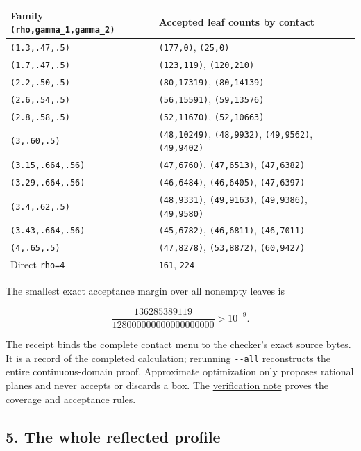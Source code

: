 \begin{longtable}[]{@{}ll@{}}
\toprule\noalign{}
Family \texttt{(rho,gamma\_1,gamma\_2)} & Accepted leaf counts by contact \\
\midrule\noalign{}
\endhead
\bottomrule\noalign{}
\endlastfoot
\texttt{(1.3,.47,.5)} & \texttt{(177,0)}, \texttt{(25,0)} \\
\texttt{(1.7,.47,.5)} & \texttt{(123,119)}, \texttt{(120,210)} \\
\texttt{(2.2,.50,.5)} & \texttt{(80,17319)}, \texttt{(80,14139)} \\
\texttt{(2.6,.54,.5)} & \texttt{(56,15591)}, \texttt{(59,13576)} \\
\texttt{(2.8,.58,.5)} & \texttt{(52,11670)}, \texttt{(52,10663)} \\
\texttt{(3,.60,.5)} & \texttt{(48,10249)}, \texttt{(48,9932)}, \texttt{(49,9562)}, \texttt{(49,9402)} \\
\texttt{(3.15,.664,.56)} & \texttt{(47,6760)}, \texttt{(47,6513)}, \texttt{(47,6382)} \\
\texttt{(3.29,.664,.56)} & \texttt{(46,6484)}, \texttt{(46,6405)}, \texttt{(47,6397)} \\
\texttt{(3.4,.62,.5)} & \texttt{(48,9331)}, \texttt{(49,9163)}, \texttt{(49,9386)}, \texttt{(49,9580)} \\
\texttt{(3.43,.664,.56)} & \texttt{(45,6782)}, \texttt{(46,6811)}, \texttt{(46,7011)} \\
\texttt{(4,.65,.5)} & \texttt{(47,8278)}, \texttt{(53,8872)}, \texttt{(60,9427)} \\
Direct \texttt{rho=4} & \texttt{161}, \texttt{224} \\
\end{longtable}

The smallest exact acceptance margin over all nonempty leaves is

\[
\frac{136285389119}{128000000000000000000}>10^{-9}.
\]

The receipt binds the complete contact menu to the checker's exact source bytes. It is a record of the completed calculation; rerunning \texttt{-\/-all} reconstructs the entire continuous-domain proof. Approximate optimization only proposes rational planes and never accepts or discards a box. The \href{https://github.com/icekylinx/algorithm-frontier/blob/main/problems/subset-sum-fast-deterministic/verify/README.md}{verification note} proves the coverage and acceptance rules.

\hypertarget{af-a9ec399514-the-whole-reflected-profile}{%
\subsection{5. The whole reflected profile}\label{af-a9ec399514-the-whole-reflected-profile}}

